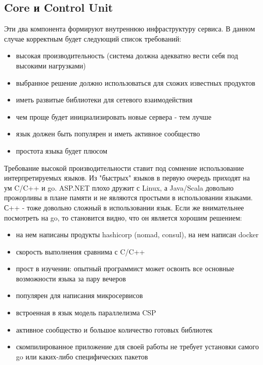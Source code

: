 \subsection{Core и Control Unit}

Эти два компонента формируют внутреннюю инфраструктуру сервиса. В данном случае корректным будет следующий список требований:

\begin{itemize}
	\item высокая производительность (система должна адекватно вести себя под высокими нагрузками)
	\item выбранное решение должно использоваться для схожих известных продуктов
	\item иметь развитые библиотеки для сетевого взаимодействия
	\item чем проще будет инициализировать новые сервера - тем лучше
	\item язык должен быть популярен и иметь активное сообщество
	\item простота языка будет плюсом
\end{itemize}

Требование высокой производительности ставит под сомнение использование интерпретируемых языков. Из "быстрых" языков в первую очередь приходят на ум C/C++ и go. ASP.NET плохо дружит с Linux, а Java/Scala довольно прожорливы в плане памяти и не являются простыми в использовании языками. С++ - тоже довольно сложный в использовании язык. Если же внимательнее посмотреть на go, то становится видно, что он является хорошим решением:

\begin{itemize}
	\item на нем написаны продукты hashicorp (nomad, consul), на нем написан docker
	\item скорость выполнения сравнима с C/C++
	\item прост в изучении: опытный программист может освоить все основные возможности языка за пару вечеров
	\item популярен для написания микросервисов
	\item встроенная в язык модель параллелизма CSP
	\item активное сообщество и большое количество готовых библиотек
	\item скомпилированное приложение для своей работы не требует установки самого go или каких-либо специфических пакетов
\end{itemize}

